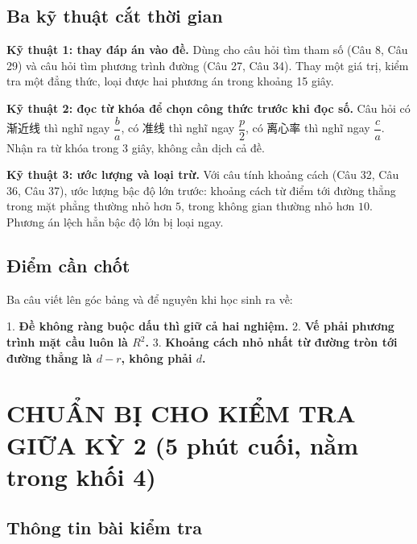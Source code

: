 \documentclass[11pt, a4paper]{article}
\begin{document}
\subsection{Ba kỹ thuật cắt thời gian}

\textbf{Kỹ thuật 1: thay đáp án vào đề.} Dùng cho câu hỏi tìm tham số (Câu 8, Câu 29) và câu hỏi tìm phương trình đường (Câu 27, Câu 34). Thay một giá trị, kiểm tra một đẳng thức, loại được hai phương án trong khoảng 15 giây.

\textbf{Kỹ thuật 2: đọc từ khóa để chọn công thức trước khi đọc số.} Câu hỏi có 渐近线 thì nghĩ ngay $\dfrac{b}{a}$, có 准线 thì nghĩ ngay $\dfrac{p}{2}$, có 离心率 thì nghĩ ngay $\dfrac{c}{a}$. Nhận ra từ khóa trong 3 giây, không cần dịch cả đề.

\textbf{Kỹ thuật 3: ước lượng và loại trừ.} Với câu tính khoảng cách (Câu 32, Câu 36, Câu 37), ước lượng bậc độ lớn trước: khoảng cách từ điểm tới đường thẳng trong mặt phẳng thường nhỏ hơn $5$, trong không gian thường nhỏ hơn $10$. Phương án lệch hẳn bậc độ lớn bị loại ngay.

\subsection{Điểm cần chốt}

Ba câu viết lên góc bảng và để nguyên khi học sinh ra về:

1. \textbf{Đề không ràng buộc dấu thì giữ cả hai nghiệm.}
2. \textbf{Vế phải phương trình mặt cầu luôn là $R^2$.}
3. \textbf{Khoảng cách nhỏ nhất từ đường tròn tới đường thẳng là $d-r$, không phải $d$.}

\section{CHUẨN BỊ CHO KIỂM TRA GIỮA KỲ 2 (5 phút cuối, nằm trong khối 4)}

\subsection{Thông tin bài kiểm tra}

\end{document}
